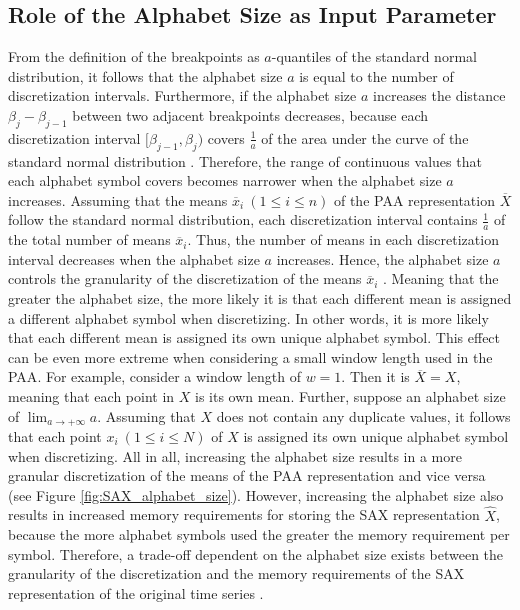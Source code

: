 \subsection*{Role of the Alphabet Size as Input Parameter} \label{parameter_alphabet_size}
From the definition of the breakpoints as $a$-quantiles of the standard normal distribution, it follows that the alphabet size $a$ is equal to the number of discretization intervals. Furthermore, if the alphabet size $a$ increases the distance $\beta_j - \beta_{j-1}$ between two adjacent breakpoints decreases, because each discretization interval $[\beta_{j-1}, \beta_j)$ covers $\frac{1}{a}$ of the area under the curve of the standard normal distribution \cite{SAX_Lin_first}. Therefore, the range of continuous values that each alphabet symbol covers becomes narrower when the alphabet size $a$ increases. \newline
Assuming that the means $\overline{x}_i \ (1 \leq i \leq n)$ of the \ac{PAA} representation $\overline{X}$ follow the standard normal distribution, each discretization interval contains $\frac{1}{a}$ of the total number of means $\overline{x}_i$. Thus, the number of means in each discretization interval decreases when the alphabet size $a$ increases. \newline
Hence, the alphabet size $a$ controls the granularity of the discretization of the means $\overline{x}_i$ \cite{SAX_Lin}. Meaning that the greater the alphabet size, the more likely it is that each different mean is assigned a different alphabet symbol when discretizing. In other words, it is more likely that each different mean is assigned its own unique alphabet symbol. \newline
This effect can be even more extreme when considering a small window length used in the \ac{PAA}. For example, consider a window length of $w = 1$. Then it is $\overline{X} = X$, meaning that each point in $X$ is its own mean. Further, suppose an alphabet size of $\lim_{a \to +\infty} a$. Assuming that $X$ does not contain any duplicate values, it follows that each point $x_i \ (1 \leq i \leq N)$ of $X$ is assigned its own unique alphabet symbol when discretizing. \newline
All in all, increasing the alphabet size results in a more granular discretization of the means of the \ac{PAA} representation and vice versa (see Figure \ref{fig:SAX_alphabet_size}). However, increasing the alphabet size also results in increased memory requirements for storing the \ac{SAX} representation $\hat{X}$, because the more alphabet symbols used the greater the memory requirement per symbol. Therefore, a trade-off dependent on the alphabet size exists between the granularity of the discretization and the memory requirements of the \ac{SAX} representation of the original time series \cite{SAX_Lin}.
